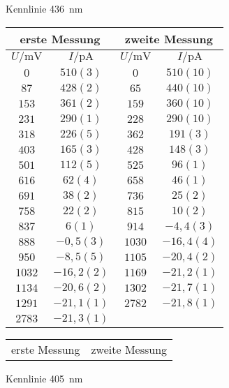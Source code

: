 \begin{figure}[htbp]
   \centering
\parbox{0.475\linewidth}{\centering
\caption{Kennlinie \SI{436}{nm}}
\begin{tabular}{cc||cc}
\hline\multicolumn{2}{c||}{erste Messung} & \multicolumn{2}{c}{zweite Messung}\\

\hline
$U / \unit{\milli\volt}$ & $I / \unit{\pico\ampere}$ & $U / \unit{\milli\volt}$ & $I / \unit{\pico\ampere}$ \\ 
\hline
$0$ & $510(3)$ & $0$ & $510(10)$ \\
$87$ & $428(2)$ & $65$ & $440(10)$ \\
$153$ & $361(2)$ & $159$ & $360(10)$ \\
$231$ & $290(1)$ & $228$ & $290(10)$ \\
$318$ & $226(5)$ & $362$ & $191(3)$ \\
$403$ & $165(3)$ & $428$ & $148(3)$ \\
$501$ & $112(5)$ & $525$ & $96(1)$ \\
$616$ & $62(4)$ & $658$ & $46(1)$ \\
$691$ & $38(2)$ & $736$ & $25(2)$ \\
$758$ & $22(2)$ & $815$ & $10(2)$ \\
$837$ & $6(1)$ & $914$ & $-4,4(3)$ \\
$888$ & $-0,5(3)$ & $1030$ & $-16,4(4)$ \\
$950$ & $-8,5(5)$ & $1105$ & $-20,4(2)$ \\
$1032$ & $-16,2(2)$ & $1169$ & $-21,2(1)$ \\
$1134$ & $-20,6(2)$ & $1302$ & $-21,7(1)$ \\
$1291$ & $-21,1(1)$ & $2782$ & $-21,8(1)$ \\
$2783$ & $-21,3(1)$ &    &    \\
\hline\end{tabular}
\label{kennlinie_436nm}
}\quad\parbox{0.475\linewidth}{\centering
\caption{Kennlinie \SI{405}{nm}}
\begin{tabular}{cc||cc}
\hline\multicolumn{2}{c||}{erste Messung} & \multicolumn{2}{c}{zweite Messung}\\


\end{tabular}}
\end{figure}
